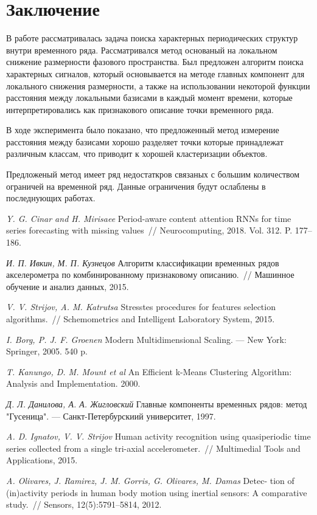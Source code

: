 \documentclass[12pt, twoside]{article}
\begin{document}
\section{Заключение}
В работе рассматривалась задача поиска характерных периодических структур внутри временного ряда. Рассматривался метод основаный на локальном снижение размерности фазового пространства. Был предложен алгоритм поиска характерных сигналов, который основывается на методе главных компонент для локального снижения размерности, а также на использовании некоторой функции расстояния между локальными базисами в каждый момент времени, которые интерпретировались как признакового описание точки временного ряда.

В ходе эксперимента было показано, что предложенный метод измерение расстояния между базисами хорошо разделяет точки которые принадлежат различным классам, что приводит к хорошей кластеризации объектов.

Предложеный метод имеет ряд недостаткров связаных с большим количеством ограничей на временной ряд. Данные ограничения будут ослаблены в последнующих работах.

\begin{thebibliography}{99}
	\textit{Y. G. Cinar and H. Mirisaee} Period-aware content attention RNNs for time series forecasting with missing values~// Neurocomputing, 2018. Vol. 312. P. 177--186.
	
	\textit{И. П. Ивкин,  М. П. Кузнецов} Алгоритм классификации временных рядов акселерометра по комбинированному признаковому описанию.~// Машинное обучение и анализ данных, 2015.
	
	\textit{V. V. Strijov, A. M. Katrutsa} Stresstes procedures for features selection algorithms.~// Schemometrics and Intelligent Laboratory System, 2015.
	
	\textit{I. Borg, P. J. F. Groenen} Modern Multidimensional Scaling. --- New York: Springer, 2005. 540 p.
	
	\textit{T. Kanungo, D. M. Mount et al} An Efficient k-Means Clustering Algorithm: Analysis and Implementation. 2000.
	
	\textit{Д. Л. Данилова, А. А. Жигловский} Главные компоненты временных рядов: метод "Гусеница". --- Санкт-Петербурскиий университет, 1997.
	
	\textit{A. D. Ignatov, V. V. Strijov} Human activity recognition using quasiperiodic time series collected from a single tri-axial accelerometer.~// Multimedial Tools and Applications, 2015.
	
	\textit{A. Olivares, J. Ramirez, J. M. Gorris, G. Olivares, M. Damas} Detec- tion of (in)activity periods in human body motion using inertial sensors: A comparative study.~// Sensors, 12(5):5791–5814, 2012.

	
\end{thebibliography}
\end{document}
